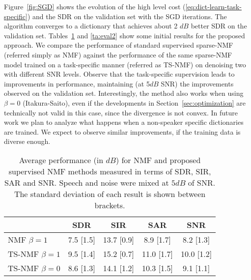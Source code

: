  Figure~\ref{fig:SGD} shows the evolution of the high level cost (\ref{eq:dict-learn-task-specific}) and the SDR on
the validation set with the SGD iterations. The algorithm converges to a dictionary that achieves about 2 $dB$ better
SDR on the validation set. Tables~\ref{ta:eval} and \ref{ta:eval2} show some initial results for the proposed approach.
We compare the performance of standard supervised sparse-NMF (referred simply as NMF) against
the performance of the same sparse-NMF model trained on a task-specific manner (referred as TS-NMF)
on denoising two with different SNR levels.
Observe that the task-specific supervision leads to improvements in performance, maintaining (at 5$dB $ SNR) the improvements observed on the validation set. 
Interestingly, the method also works when using $\beta=0$ (Itakura-Saito), even if the developments in Section~\ref{sec:optimization}
are technically not valid in this case, since the divergence is not convex.
In future work
we plan to analyze what happens when a non-speaker specific dictionaries are trained. We
expect to observe similar improvements, if the training data is diverse enough.

\begin{table}[tb]
\caption{Average performance (in $dB$) for NMF and proposed supervised NMF methods measured in terms of SDR, SIR, SAR and SNR.
Speech and noise were mixed at $5dB$ of SNR. The standard deviation of each result is shown between brackets. \label{ta:eval}}
\vspace{-1.5ex}
\begin{center}
\small{
\begin{tabular}{l|c|c|c|c}
  \hline\hline
& SDR & SIR & SAR & SNR\\
\hline
NMF $\beta=1$   &7.5 [1.5] & 13.7 [0.9] &   8.9 [1.7] &    8.2 [1.3]\\
\hline
TS-NMF $\beta=1$ & 9.5 [1.4] &   15.2 [0.7] & 11.0 [1.7] &    10.0 [1.2]\\
TS-NMF $\beta=0$ &  8.6 [1.3] & 14.1 [1.2]  & 10.3 [1.5] &  9.1 [1.1]\\
  \hline\hline
\end{tabular}
}
\end{center}
\vspace{-2.5ex}
\end{table}

